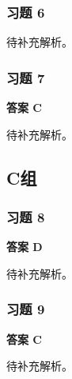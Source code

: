 \subsubsection*{习题 6}
\begin{solution}
	待补充解析。
\end{solution}

\subsubsection*{习题 7}
\begin{solution}
	\textbf{答案 C}

	待补充解析。
\end{solution}

\subsection*{C组}

\subsubsection*{习题 8}
\begin{solution}
	\textbf{答案 D}

	待补充解析。
\end{solution}

\subsubsection*{习题 9}
\begin{solution}
	\textbf{答案 C}

	待补充解析。
\end{solution}
